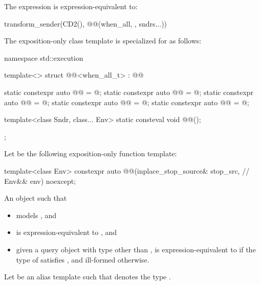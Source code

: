 \pnum
The expression  is expression-equivalent to:
\begin{codeblock}
transform_sender(CD2(), @@(when_all, {}, sndrs...))
\end{codeblock}

\pnum
The exposition-only class template 
is specialized for  as follows:
\begin{codeblock}
namespace std::execution {
  template<>
  struct @@<when_all_t> : @@ {
    static constexpr auto @@ = @\seebelow@;
    static constexpr auto @@ = @\seebelow@;
    static constexpr auto @@ = @\seebelow@;
    static constexpr auto @@ = @\seebelow@;
    static constexpr auto @@ = @\seebelow@;

    template<class Sndr, class... Env>
      static consteval void @@();
  };
}
\end{codeblock}

\pnum
Let  be
the following exposition-only function template:
\begin{codeblock}
template<class Env>
  constexpr auto @@(inplace_stop_source& stop_src,               // \expos
                                   Env&& env) noexcept;
\end{codeblock}

\pnum
\returns
An object  such that
\begin{itemize}
\item
{} models , and
\item
{} is expression-equivalent to
, and
\item
given a query object 
with type other than \cv{} ,
 is expression-equivalent to 
if the type of  satisfies , and
ill-formed otherwise.
\end{itemize}

\pnum
Let  be an alias template such that
 denotes the type
.

